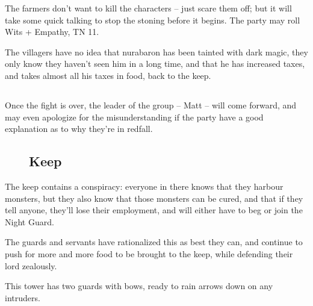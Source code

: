 The farmers don't want to kill the characters -- just scare them off; but it will take some quick talking to stop the stoning before it begins.  The party may roll Wits + Empathy, TN 11.

The villagers have no idea that \gls{nurabaron} has been tainted with dark magic, they only know they haven't seen him in a long time, and that he has increased taxes, and takes almost all his taxes in food, back to the keep.

\label{redfall_map}


\humanfarmer

\subsection{}

Once the fight is over, the leader of the group -- Matt -- will come forward, and may even apologize for the misunderstanding if the party have a good explanation as to why they're in \gls{redfall}.

\begin{figure}
	\subsection*{ Keep}
\vspace{-2cm}

\label{redfall_keep_map}

\end{figure}

\setcounter{list}{0}

The keep contains a conspiracy: everyone in there knows that they harbour monsters, but they also know that those monsters can be cured, and that if they tell anyone, they'll lose their employment, and will either have to beg or join the Night Guard.

The guards and servants have rationalized this as best they can, and continue to push for more and more food to be brought to the keep, while defending their lord zealously.


This tower has two guards with bows, ready to rain arrows down on any intruders.


\humanarcher

